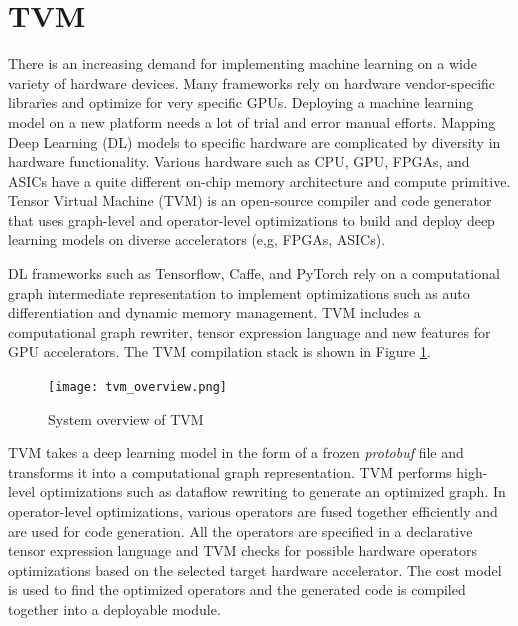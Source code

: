 \section{TVM}
There is an increasing demand for implementing machine learning on a wide variety of hardware devices. Many frameworks rely on hardware vendor-specific libraries and optimize for very specific GPUs. Deploying a machine learning model on a new platform needs a lot of trial and error manual efforts. Mapping Deep Learning (DL) models to specific hardware are complicated by diversity in hardware functionality. Various hardware such as CPU, GPU, FPGAs, and ASICs have a quite different on-chip memory architecture and compute primitive. Tensor Virtual Machine (TVM) is an open-source compiler and code generator that uses graph-level and operator-level optimizations to build and deploy deep learning models on diverse accelerators (e,g, FPGAs, ASICs).

DL frameworks such as Tensorflow, Caffe, and PyTorch rely on a computational graph intermediate representation to implement optimizations such as auto differentiation and dynamic memory management. TVM includes a computational graph rewriter, tensor expression language and new features for GPU accelerators. The TVM compilation stack is shown in Figure \ref{fig:tvm_fig}.

\begin{figure}[h!]
    \centering
    \texttt{[image: tvm\_overview.png]}
    \caption{System overview of TVM \cite{tvm_fig}}
    \label{fig:tvm_fig}
\end{figure}

TVM takes a deep learning model in the form of a frozen \textit{protobuf} file and transforms it into a computational graph representation. TVM performs high-level optimizations such as dataflow rewriting to generate an optimized graph. In operator-level optimizations, various operators are fused together efficiently and are used for code generation. All the operators are specified in a declarative tensor expression language and TVM checks for possible hardware operators optimizations based on the selected target hardware accelerator. The cost model is used to find the optimized operators and the generated code is compiled together into a deployable module.


